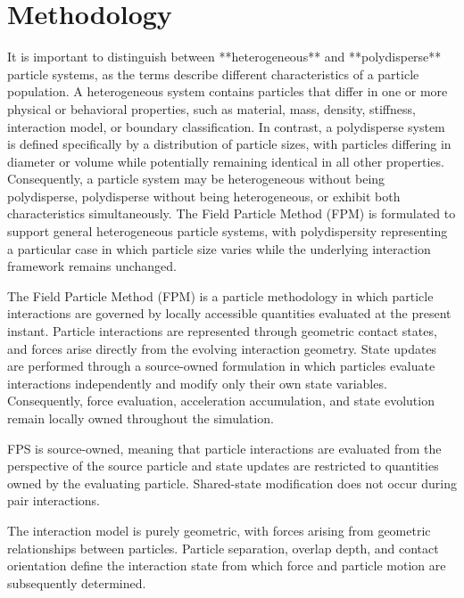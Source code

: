 \section{Methodology}


It is important to distinguish between **heterogeneous** and **polydisperse** particle systems, as the terms describe different characteristics of a particle population. A heterogeneous system contains particles that differ in one or more physical or behavioral properties, such as material, mass, density, stiffness, interaction model, or boundary classification. In contrast, a polydisperse system is defined specifically by a distribution of particle sizes, with particles differing in diameter or volume while potentially remaining identical in all other properties. Consequently, a particle system may be heterogeneous without being polydisperse, polydisperse without being heterogeneous, or exhibit both characteristics simultaneously. The Field Particle Method (FPM) is formulated to support general heterogeneous particle systems, with polydispersity representing a particular case in which particle size varies while the underlying interaction framework remains unchanged.



The Field Particle Method (FPM) is a particle methodology
in which particle interactions are governed by locally
accessible quantities evaluated at the present instant.
Particle interactions are represented through geometric
contact states, and forces arise directly from the
evolving interaction geometry. State updates are
performed through a source-owned formulation in which
particles evaluate interactions independently and modify
only their own state variables. Consequently, force
evaluation, acceleration accumulation, and state
evolution remain locally owned throughout the simulation.

FPS is source-owned, meaning that particle interactions are evaluated from the 
perspective of the source particle and state updates are restricted to quantities 
owned by the evaluating particle. Shared-state modification does not occur 
during pair interactions.

The interaction model is purely geometric, with
forces arising from geometric relationships between
particles. Particle separation, overlap depth, and
contact orientation define the interaction state
from which force and particle motion are
subsequently determined.

